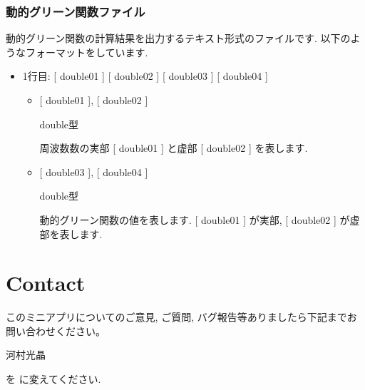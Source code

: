 \documentclass[letterpaper,10pt,dvipdfmx,openany]{sphinxmanual}
\begin{document}
\subsection{動的グリーン関数ファイル}
\label{\detokenize{shiftk_format_ja:dynamicalg}}\label{\detokenize{shiftk_format_ja:id9}}
動的グリーン関数の計算結果を出力するテキスト形式のファイルです.
以下のようなフォーマットをしています.

\begin{sphinxVerbatim}[commandchars=\\\{\}]
   
   
   
\end{sphinxVerbatim}
\begin{itemize}
\item {} 
1行目\sphinxhyphen{}:
{[} double01 {]} {[} double02 {]} {[} double03 {]} {[} double04 {]}
\begin{itemize}
\item {} 
{[} double01 {]}, {[} double02 {]}

 double型

 周波数数の実部
{[} double01 {]} と虚部 {[} double02 {]} を表します.

\item {} 
{[} double03 {]}, {[} double04 {]}

 double型

 動的グリーン関数の値を表します.
{[} double01 {]} が実部, {[} double02 {]} が虚部を表します.

\end{itemize}

\end{itemize}


\chapter{Contact}
\label{\detokenize{shiftk_contact_ja:contact}}\label{\detokenize{shiftk_contact_ja::doc}}
このミニアプリについてのご意見, ご質問,
バグ報告等ありましたら下記までお問い合わせください。

河村光晶

\begin{sphinxVerbatim}[commandchars=\\\{\}]
\end{sphinxVerbatim}

 を  に変えてください.



\renewcommand{\indexname}{索引}
\printindex
\end{document}
